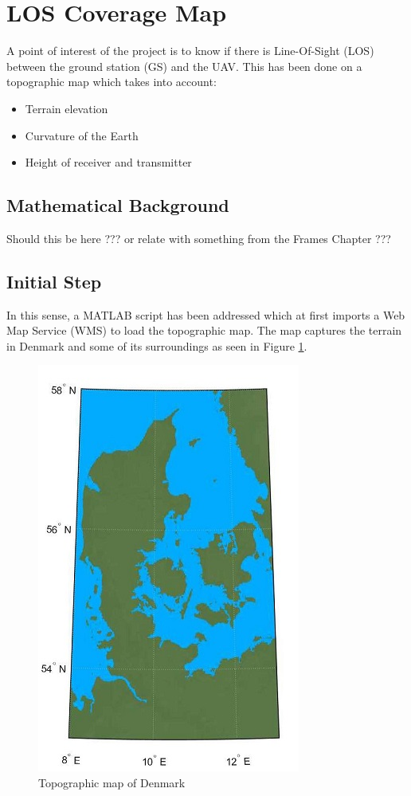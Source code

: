 \section{LOS Coverage Map}\label{sec:los_map}
A point of interest of the project is to know if there is Line-Of-Sight (LOS) between the ground station (GS) and the UAV. This has been done on a topographic map which takes into account:

\begin{itemize}
	\item Terrain elevation
	\item Curvature of the Earth
	\item Height of receiver and transmitter
\end{itemize}

\subsection{Mathematical Background}
Should this be here ??? or relate with something from the Frames Chapter ???

\subsection{Initial Step}
In this sense, a MATLAB script has been addressed which at first imports a Web Map Service (WMS) to load the topographic map. The map captures the terrain in Denmark and some of its surroundings as seen in Figure \ref{fig:dk_map}.

\begin{figure}[h]
	\centering
	\includegraphics[scale=2]{figures/denmark.jpg}
	\caption{Topographic map of Denmark}
   	\label{fig:dk_map}
\end{figure}


